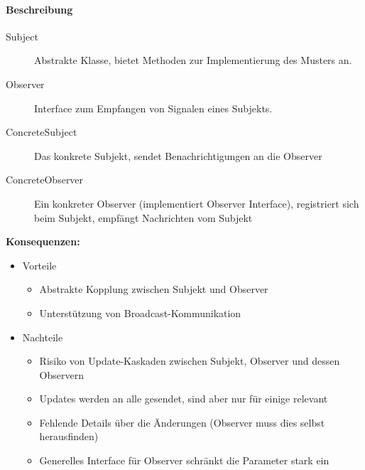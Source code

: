 \documentclass[
    ngerman,
    color=3b,
    summary,
    boxarc,
    main,
]{rubos-tuda-template}
\begin{document}
\paragraph{Beschreibung}\mbox{}\par
\begin{description}
    \item[Subject] Abstrakte Klasse, bietet Methoden zur Implementierung des Musters an.
    \item[Observer] Interface zum Empfangen von Signalen eines Subjekts.
    \item[ConcreteSubject] Das konkrete Subjekt, sendet Benachrichtigungen an die Observer
    \item[ConcreteObserver] Ein konkreter Observer (implementiert Observer Interface), registriert sich beim Subjekt, empfängt Nachrichten vom Subjekt
\end{description}

\clearpage
\textbf{Konsequenzen:}
\begin{itemize}
    \item Vorteile
          \begin{itemize}
              \item Abstrakte Kopplung zwischen Subjekt und Observer
              \item Unterstützung von Broadcast-Kommunikation
          \end{itemize}
    \item Nachteile
          \begin{itemize}
              \item Risiko von Update-Kaskaden zwischen Subjekt, Observer und dessen Observern
              \item Updates werden an alle gesendet, sind aber nur für einige relevant
              \item Fehlende Details über die Änderungen (Observer muss dies selbst herausfinden)
              \item Generelles Interface für Observer schränkt die Parameter stark ein
          \end{itemize}
\end{itemize}
\end{document}
